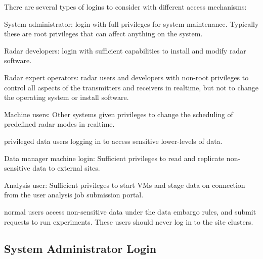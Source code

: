 \documentclass[12pt,a4paper]{article}
\begin{document}
There are several types of logins to consider with different access mechanisms:
\bitm
\item System administrator: login with full privileges for system maintenance. Typically these are root privileges that can affect anything on the system.

\item Radar developers: login with sufficient capabilities to install and modify radar software.

\item Radar expert operators: radar users and developers with non-root privileges to control all aspects of the transmitters and receivers in realtime, but not to change the operating system or install software.

\item Machine users: Other systems given privileges to change the scheduling of predefined radar modes in realtime. 

\item \EC privileged data users logging in to access sensitive lower-levels of data.

\item Data manager machine login: Sufficient privileges to read and replicate non-sensitive data to external sites.

\item Analysis user: Sufficient privileges to start VMs and stage data on connection from the user analysis job submission portal.
 
\item \EC normal users access non-sensitive data under the \EC data embargo rules, and submit requests to run experiments. These users should never log in to the site clusters.

\eitm

\subsection{System Administrator Login}
\label{sec:admin}

\end{document}
